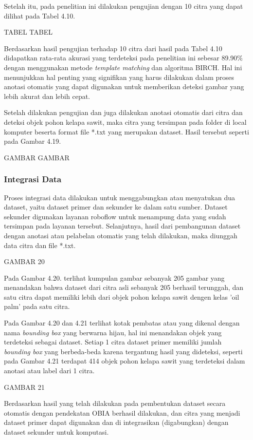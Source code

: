 Setelah itu, pada penelitian ini dilakukan pengujian dengan 10 citra yang dapat dilihat pada Tabel 4.10.

TABEL TABEL

Berdasarkan hasil pengujian terhadap 10 citra dari hasil pada Tabel 4.10 didapatkan rata-rata akurasi yang terdeteksi pada penelitian ini sebesar 89.90\% dengan menggunakan metode \textit{template matching} dan algoritma BIRCH. Hal ini menunjukkan hal penting yang signifikan yang harus dilakukan dalam proses anotasi otomatis yang dapat digunakan untuk memberikan deteksi gambar yang lebih akurat dan lebih cepat.

Setelah dilakukan pengujian dan juga dilakukan anotasi otomatis dari citra dan deteksi objek pohon kelapa sawit, maka citra yang tersimpan pada folder di local komputer beserta format file *.txt yang merupakan dataset. Hasil tersebut seperti pada Gambar 4.19.

GAMBAR GAMBAR

\subsubsection{Integrasi Data}
\hspace{1,2cm}
Proses integrasi data dilakukan untuk menggabungkan atau menyatukan dua dataset, yaitu dataset primer dan sekunder ke dalam satu sumber. Dataset sekunder digunakan layanan roboflow untuk menampung data yang sudah tersimpan pada layanan tersebut. Selanjutnya, hasil dari pembangunan dataset dengan anotasi atau pelabelan otomatis yang telah dilakukan, maka diunggah data citra dan file *.txt. 


GAMBAR 20


Pada Gambar 4.20. terlihat kumpulan gambar sebanyak 205 gambar yang menandakan bahwa dataset dari citra asli sebanyak 205 berhasil terunggah, dan satu citra dapat memiliki lebih dari objek pohon kelapa sawit dengen kelas 'oil palm' pada satu citra. 

Pada Gambar 4.20 dan 4.21 terlihat kotak pembatas atau yang dikenal dengan nama \textit{bounding box} yang berwarna hijau, hal ini menandakan objek yang terdeteksi sebagai dataset. Setiap 1 citra dataset primer memiliki jumlah \textit{bounding box} yang berbeda-beda karena tergantung hasil yang dideteksi, seperti pada Gambar 4.21 terdapat 414 objek pohon kelapa sawit yang terdeteksi dalam anotasi atau label dari 1 citra. 

GAMBAR 21

Berdasarkan hasil yang telah dilakukan pada pembentukan dataset secara otomatis dengan pendekatan OBIA berhasil dilakukan, dan citra yang menjadi dataset primer dapat digunakan dan di integrasikan (digabungkan) dengan dataset sekunder untuk komputasi. 

